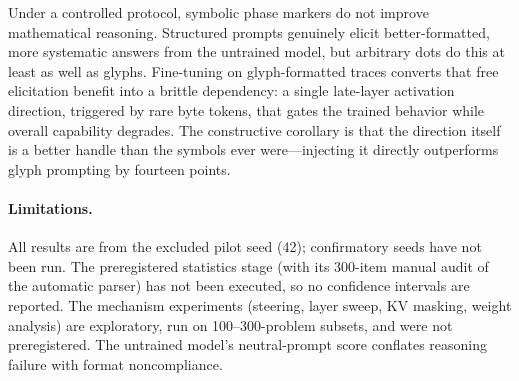 \documentclass[11pt]{article}
\begin{document}
Under a controlled protocol, symbolic phase markers do not improve mathematical reasoning.
Structured prompts genuinely elicit better-formatted, more systematic answers from the untrained model, but arbitrary dots do this at least as well as glyphs.
Fine-tuning on glyph-formatted traces converts that free elicitation benefit into a brittle dependency: a single late-layer activation direction, triggered by rare byte tokens, that gates the trained behavior while overall capability degrades.
The constructive corollary is that the direction itself is a better handle than the symbols ever were---injecting it directly outperforms glyph prompting by fourteen points.

\paragraph{Limitations.}
All results are from the excluded pilot seed (42); confirmatory seeds have not been run.
The preregistered statistics stage (with its 300-item manual audit of the automatic parser) has not been executed, so no confidence intervals are reported.
The mechanism experiments (steering, layer sweep, KV masking, weight analysis) are exploratory, run on 100--300-problem subsets, and were not preregistered.
The untrained model's neutral-prompt score conflates reasoning failure with format noncompliance.
\end{document}
